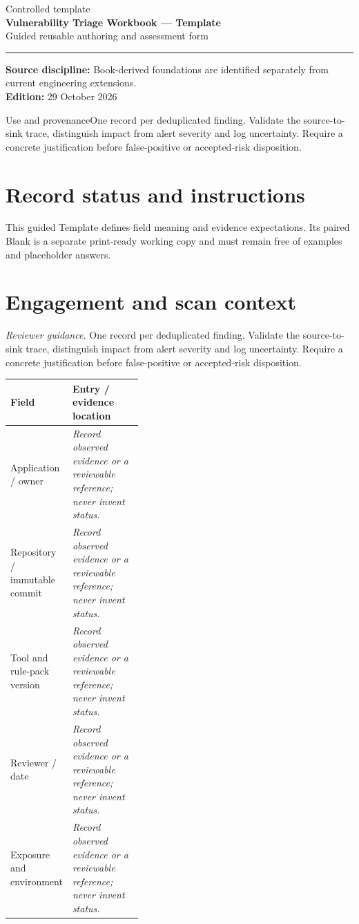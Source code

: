 \documentclass[10pt,letterpaper]{article}
\begin{document}
\hypersetup{pageanchor=false}%
\begin{titlepage}
\vspace*{1.0in}
{\color{bluegray}\Large Controlled template}\\[1.0em]
{\color{navy}\Huge\bfseries Vulnerability Triage Workbook --- Template}\\[0.7em]
{\Large Guided reusable authoring and assessment form}\\[2.0em]
\rule{\linewidth}{1.0pt}
\vfill
\textbf{Source discipline:} Book-derived foundations are identified separately from current engineering extensions.\\
\textbf{Edition:} 29 October 2026
\end{titlepage}\hypersetup{pageanchor=true}
\tableofcontents
\clearpage
\begin{focusbox}{Use and provenance}One record per deduplicated finding. Validate the source-to-sink trace, distinguish impact from alert severity and log uncertainty. Require a concrete justification before false-positive or accepted-risk disposition.\end{focusbox}
\section{Record status and instructions}
This guided Template defines field meaning and evidence expectations. Its paired Blank is a separate print-ready working copy and must remain free of examples and placeholder answers.

\section{Engagement and scan context}
\textit{Reviewer guidance.} One record per deduplicated finding. Validate the source-to-sink trace, distinguish impact from alert severity and log uncertainty. Require a concrete justification before false-positive or accepted-risk disposition.
\begin{tabularx}{\linewidth}{@{}p{0.38\linewidth}Y@{}}
\toprule Field & Entry / evidence location\\\midrule
Application / owner & \textit{Record observed evidence or a reviewable reference; never invent status.}\\[1.0em]
\midrule
Repository / immutable commit & \textit{Record observed evidence or a reviewable reference; never invent status.}\\[1.0em]
\midrule
Tool and rule-pack version & \textit{Record observed evidence or a reviewable reference; never invent status.}\\[1.0em]
\midrule
Reviewer / date & \textit{Record observed evidence or a reviewable reference; never invent status.}\\[1.0em]
\midrule
Exposure and environment & \textit{Record observed evidence or a reviewable reference; never invent status.}\\[1.0em]
\midrule
\end{tabularx}
\end{document}

